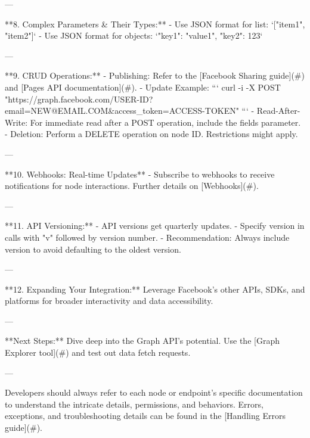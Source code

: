 ---

**8. Complex Parameters & Their Types:**
- Use JSON format for list: `["item1", "item2"]`
- Use JSON format for objects: `{"key1": "value1", "key2": 123}`

---

**9. CRUD Operations:**
- Publishing: Refer to the [Facebook Sharing guide](#) and [Pages API documentation](#).
- Update Example: 
```
curl -i -X POST "https://graph.facebook.com/USER-ID?email=NEW@EMAIL.COM&access_token=ACCESS-TOKEN"
```
- Read-After-Write: For immediate read after a POST operation, include the fields parameter.
- Deletion: Perform a DELETE operation on node ID. Restrictions might apply.

---

**10. Webhooks: Real-time Updates**
- Subscribe to webhooks to receive notifications for node interactions. Further details on [Webhooks](#).

---

**11. API Versioning:**
- API versions get quarterly updates.
- Specify version in calls with "v" followed by version number.
- Recommendation: Always include version to avoid defaulting to the oldest version.

---

**12. Expanding Your Integration:**
Leverage Facebook’s other APIs, SDKs, and platforms for broader interactivity and data accessibility.

---

**Next Steps:** Dive deep into the Graph API’s potential. Use the [Graph Explorer tool](#) and test out data fetch requests. 

--- 

Developers should always refer to each node or endpoint's specific documentation to understand the intricate details, permissions, and behaviors. Errors, exceptions, and troubleshooting details can be found in the [Handling Errors guide](#).